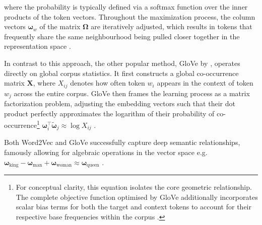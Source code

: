 where the probability is typically defined via a softmax function over the inner products of the token vectors. Throughout the maximization process, the column vectors $\boldsymbol{\omega}_w$ of the matrix $\mathbf{\Omega}$ are iteratively adjusted, which results in tokens that frequently share the same neighbourhood being pulled closer together in the representation space \cite{Mikolov2013}\cite[p. 108 f.]{Jurafsky2024_SLP}\cite[p. 124 f.]{Goldberg2017}\cite{MikolovSCCD13}.


In contrast to this approach, the other popular method, \ac{GloVe} by \citet{pennington2014glove}, operates directly on global corpus statistics. It first constructs a global co-occurrence matrix $\mathbf{X}$, where $X_{ij}$ denotes how often token $w_i$ appears in the context of token $w_j$ across the entire corpus. \ac{GloVe} then frames the learning process as a matrix factorization problem, adjusting the embedding vectors such that their dot product perfectly approximates the logarithm of their probability of co-occurrence\footnote{For conceptual clarity, this equation isolates the core geometric relationship. The complete objective function optimised by \ac{GloVe} additionally incorporates scalar bias terms for both the target and context tokens to account for their respective base frequencies within the corpus \cite{pennington2014glove}.} $\boldsymbol{\omega}_i^\top \tilde{\boldsymbol{\omega}}_j \approx \log X_{ij}$ \cite[p.~127]{Goldberg2017}\cite{pennington2014glove}.

Both Word2Vec and \ac{GloVe} successfully capture deep semantic relationships, famously allowing for algebraic operations in the vector space e.g. $\boldsymbol{\omega}_{\text{king}} - \boldsymbol{\omega}_{\text{man}} + \boldsymbol{\omega}_{\text{woman}} \approx \boldsymbol{\omega}_{\text{queen}}$ \cite{Mikolov2013}\cite[p.~112~f.]{Jurafsky2024_SLP}. 

